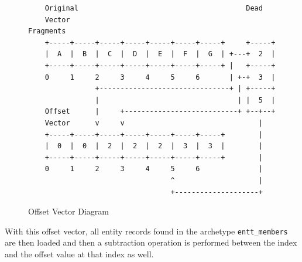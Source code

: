 \begin{figure}[H]
\begin{verbatim}
    Original                                        Dead                     
    Vector                                          Fragments                
    +-----+-----+-----+-----+-----+-----+-----+     +-----+                  
    |  A  |  B  |  C  |  D  |  E  |  F  |  G  | +---+  2  |                  
    +-----+-----+-----+-----+-----+-----+-----+ |   +-----+                  
    0     1     2     3     4     5     6       | +-+  3  |                  
                +-------------------------------+ | +-----+                  
                |                                 | |  5  |                  
    Offset      |     +---------------------------+ +--+--+                  
    Vector      v     v                                |                     
    +-----+-----+-----+-----+-----+-----+-----+        |                     
    |  0  |  0  |  2  |  2  |  2  |  3  |  3  |        |                     
    +-----+-----+-----+-----+-----+-----+-----+        |                     
    0     1     2     3     4     5     6              |                     
                                  ^                    |                     
                                  +--------------------+   
\end{verbatim}
\caption{Offset Vector Diagram}
\label{code:component_retrieval}
\end{figure}

With this offset vector, all entity records found in the archetype \texttt{entt\_members} are then loaded and then a subtraction operation is performed between the index and the offset value at that index as well. 

